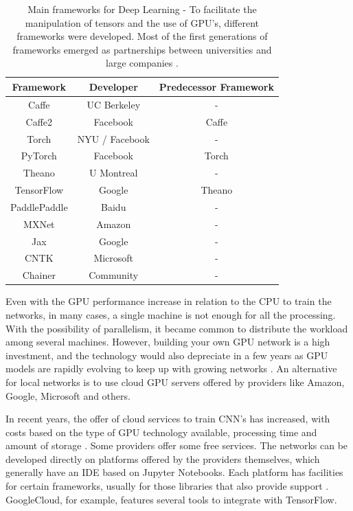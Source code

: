 \begin{center}
\begin{table}
    \begin{tabular}{| c | c | c |} 
        \hline
        \textbf{Framework}& \textbf{Developer}& \textbf{Predecessor Framework}\\ \hline
        
        Caffe& UC Berkeley& -\\ \hline
        Caffe2& Facebook& Caffe\\ \hline
        Torch& NYU / Facebook& -\\ \hline
        PyTorch& Facebook& Torch\\ \hline
        Theano& U Montreal& -\\ \hline
        TensorFlow& Google& Theano\\ \hline
        PaddlePaddle& Baidu& -\\ \hline
        MXNet& Amazon& -\\ \hline
        Jax& Google& -\\ \hline
        CNTK& Microsoft& -\\ \hline
        Chainer& Community& -\\ \hline

    \end{tabular}
    \caption{Main frameworks for Deep Learning  - To facilitate the manipulation of tensors and the use of GPU's, different frameworks were developed. Most of the first generations of frameworks emerged as partnerships between universities and large companies \cite{johnson2019}.}
    \label{table:IAframework}
\end{table}
\end{center}

Even with the GPU performance increase in relation to the CPU to train the networks, in many cases, a single machine is not enough for all the processing. With the possibility of parallelism, it became common to distribute the workload among several machines. However, building your own GPU network is a high investment, and the technology would also depreciate in a few years as GPU models are rapidly evolving to keep up with growing networks \cite{wangenheim2018}. An alternative for local networks is to use cloud GPU servers offered by providers like Amazon, Google, Microsoft and others.

In recent years, the offer of cloud services to train CNN's has increased, with costs based on the type of GPU technology available, processing time and amount of storage \cite{wangenheim2018}. Some providers offer some free services. The networks can be developed directly on platforms offered by the providers themselves, which generally have an IDE based on Jupyter Notebooks. Each platform has facilities for certain frameworks, usually for those libraries that also provide support \cite{wangenheim2018}. GoogleCloud, for example, features several tools to integrate with TensorFlow.


